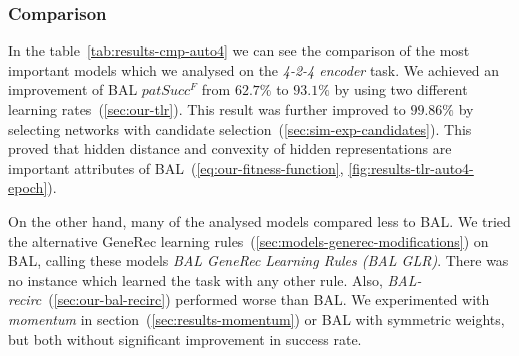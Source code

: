 
\subsubsection{Comparison} 
\label{sec:tlr-auto4-cmp} 

In the table~\ref{tab:results-cmp-auto4} we can see the comparison of the most important models which we analysed on the \emph{4-2-4 encoder} task. We achieved an improvement of BAL $patSucc^F$ from $62.7\%$ to $93.1\%$ by using two different learning rates~(\ref{sec:our-tlr}). This result was further improved to $99.86\%$ by selecting networks with candidate selection~(\ref{sec:sim-exp-candidates}). This proved that hidden distance and convexity of hidden representations are important attributes of BAL~(\ref{eq:our-fitness-function}, \ref{fig:results-tlr-auto4-epoch}). 

On the other hand, many of the analysed models compared less to BAL. We tried the alternative GeneRec learning rules~(\ref{sec:models-generec-modifications}) on BAL, calling these models \emph{BAL GeneRec Learning Rules (BAL GLR)}. There was no instance which learned the task with any other rule. Also, \emph{BAL-recirc}~(\ref{sec:our-bal-recirc}) performed worse than BAL. We experimented with \emph{momentum} in section~(\ref{sec:results-momentum}) or BAL with symmetric weights, but both without significant improvement in success rate.

